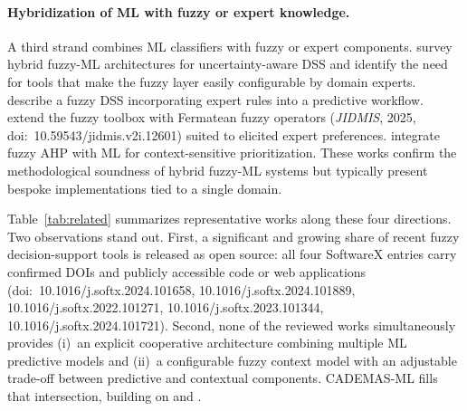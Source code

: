 \paragraph{Hybridization of ML with fuzzy or expert knowledge.}
A third strand combines ML classifiers with fuzzy or expert components.
\citet{kumar2025fuzzy} survey hybrid fuzzy-ML architectures for uncertainty-aware DSS and
identify the need for tools that make the fuzzy layer easily configurable by domain experts.
\citet{ghosh2020fuzzydss} describe a fuzzy DSS incorporating expert rules into a predictive
workflow. \citet{suvitha2025fermateanfuzzy} extend the fuzzy toolbox with Fermatean fuzzy
operators (\textit{JIDMIS}, 2025, doi:~10.59543/jidmis.v2i.12601) suited to elicited expert
preferences. \citet{aly2018fuzzyahp} integrate fuzzy AHP with ML for context-sensitive
prioritization. These works confirm the methodological soundness of hybrid fuzzy-ML systems
but typically present bespoke implementations tied to a single domain.

Table~\ref{tab:related} summarizes representative works along these four directions.
Two observations stand out. First, a significant and growing share of recent fuzzy
decision-support tools is released as open source: all four SoftwareX entries carry
confirmed DOIs and publicly accessible code or web applications
(doi:~10.1016/j.softx.2024.101658, 10.1016/j.softx.2024.101889,
10.1016/j.softx.2022.101271, 10.1016/j.softx.2023.101344, 10.1016/j.softx.2024.101721).
Second, none of the reviewed works simultaneously provides (i)~an explicit cooperative
architecture combining multiple ML predictive models and (ii)~a configurable fuzzy context
model with an adjustable trade-off between predictive and contextual components.
CADEMAS-ML fills that intersection, building on \citet{novoa2026cademas} and
\citet{godz2026attrition}.

